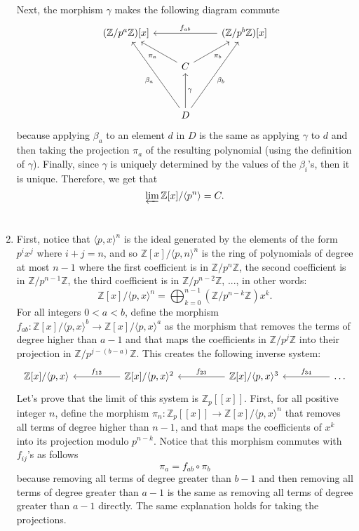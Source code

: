 \documentclass{article}
\newcommand{\Z}{\mathbb{Z}}
\newcommand{\Zn}[1]{\mathbb{Z}/ #1 \mathbb{Z}}
\begin{document}
\begin{enumerate}[label=(\alph*)]
    Next, the morphism $\gamma$ makes the following diagram commute 
    \[\begin{tikzcd}
	{(\Zn{p^a})[x]} && {(\Zn{p^b})[x]} \\
	& {C} \\
	\\
	& D
	\arrow["{f_{ab}}"', from=1-3, to=1-1]
	\arrow["{\pi_a}", from=2-2, to=1-1]
	\arrow["{\pi_b}"', from=2-2, to=1-3]
	\arrow["{\beta_a}", from=4-2, to=1-1]
	\arrow["{\beta_b}"', from=4-2, to=1-3]
	\arrow["\gamma"', from=4-2, to=2-2]
    \end{tikzcd}\]
    because applying $\beta_a$ to an element $d$ in $D$ is the same as applying $\gamma$ to $d$ and then taking the projection $\pi_a$ of the resulting polynomial (using the definition of $\gamma$). Finally, since $\gamma$ is uniquely determined by the values of the $\beta_i$'s, then it is unique. Therefore, we get that
    $$\varprojlim\Z[x]/\langle p^n \rangle = C.$$ \\

    \item First, notice that $\langle p,x \rangle^n$ is the ideal generated by the elements of the form $p^ix^j$ where $i + j = n$, and so $\Z[x]/\langle p,n \rangle^n$ is the ring of polynomials of degree at most $n-1$ where the first coefficient is in $\Zn{p^n}$, the second coefficient is in $\Zn{p^{n-1}}$, the third coefficient is in $\Zn{p^{n-2}}$, ..., in other words:
    $$\Z[x]/\langle p,x \rangle^n = \bigoplus_{k=0}^{n-1}(\Zn{p^{n-k}})x^k.$$
    For all integers $0 < a < b$, define the morphism $f_{ab} : \Z[x]/\langle p,x \rangle^b \to \Z[x]/\langle p,x \rangle^a$ as the morphism that removes the terms of degree higher than $a-1$ and that maps the coefficients in $\Zn{p^j}$ into their projection in $\Zn{p^{j - (b-a)}}$. This creates the following inverse system:
    \[\begin{tikzcd}
	{\Z[x]/\langle p,x \rangle} && {\Z[x]/\langle p,x \rangle^2} && {\Z[x]/\langle p,x \rangle^3} && \dots
	\arrow["{f_{12}}"', from=1-3, to=1-1]
	\arrow["{f_{23}}"', from=1-5, to=1-3]
	\arrow["{f_{34}}"', from=1-7, to=1-5]
    \end{tikzcd}\]
    Let's prove that the limit of this system is $\Z_p[[x]]$. First, for all positive integer $n$, define the morphism $\pi_n : \Z_p[[x]] \to \Z[x]/\langle p,x \rangle^n$ that removes all terms of degree higher than $n-1$, and that maps the coefficients of $x^k$ into its projection modulo $p^{n-k}$. Notice that this morphism commutes with $f_{ij}$'s as follows
    $$\pi_a = f_{ab} \circ \pi_b$$
    because removing all terms of degree greater than $b-1$ and then removing all terms of degree greater than $a-1$ is the same as removing all terms of degree greater than $a-1$ directly. The same explanation holds for taking the projections. 


\end{enumerate}
\end{document}
